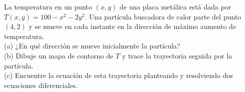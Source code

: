 \item La temperatura en un punto $(x, y)$ de una placa metálica está dada por $T(x, y) = 100 - x^2 - 2y^2$. Una partícula buscadora de calor parte del punto $(4, 2)$ y se mueve en cada instante en la dirección de máximo aumento de temperatura. \\
(a) ¿En qué dirección se mueve inicialmente la partícula? \\
(b) Dibuje un mapa de contorno de $T$ y trace la trayectoria seguida por la partícula. \\
(c) Encuentre la ecuación de esta trayectoria planteando y resolviendo dos ecuaciones diferenciales.
